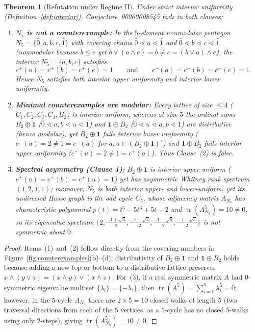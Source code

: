 \documentclass[11pt,a4paper]{article}
\newtheorem{theorem}{Theorem}[section]
\theoremstyle{definition}
\theoremstyle{remark}
\newcommand{\cov}{\lessdot}
\newcommand{\tr}{\operatorname{tr}}
\begin{document}
\begin{theorem}[Refutation under Regime II]\label{thm:regime-II}
Under strict interior uniformity (Definition~\ref{def:interior}), Conjecture~00000008545 fails in both clauses:
\begin{enumerate}
  \item[(1)] \textbf{$N_5$ is not a counterexample:} In the $5$-element nonmodular pentagon $N_5 = \{\hat{0}, a, b, c, \hat{1}\}$ with covering chains $\hat{0} \cov a \cov \hat{1}$ and $\hat{0} \cov b \cov c \cov \hat{1}$ (nonmodular because $b \le c$ yet $b \vee (a \wedge c) = b \neq c = (b \vee a) \wedge c$), the interior $N_5^\circ = \{a, b, c\}$ satisfies
  \[
    c^+(a) = c^+(b) = c^+(c) = 1 \qquad \text{and} \qquad c^-(a) = c^-(b) = c^-(c) = 1.
  \]
  Hence $N_5$ \emph{satisfies} both interior upper uniformity and interior lower uniformity.
  \item[(2)] \textbf{Minimal counterexamples are modular:} Every lattice of size $\le 4$ ($C_1, C_2, C_3, C_4, B_2$) is interior uniform, whereas at size $5$ the ordinal sums $B_2 \oplus \mathbf{1}$ ($\hat{0} \cov a, b \cov u \cov \hat{1}$) and $\mathbf{1} \oplus B_2$ ($\hat{0} \cov u \cov a, b \cov \hat{1}$) are \emph{distributive} (hence \emph{modular}), yet $B_2 \oplus \mathbf{1}$ fails interior lower uniformity ($c^-(u) = 2 \neq 1 = c^-(a)$ for $a, u \in (B_2 \oplus \mathbf{1})^\circ$) and $\mathbf{1} \oplus B_2$ fails interior upper uniformity ($c^+(u) = 2 \neq 1 = c^+(a)$). Thus Clause~(2) is false.
  \item[(3)] \textbf{Spectral asymmetry (Clause 1):} $B_2 \oplus \mathbf{1}$ is interior upper-uniform ($c^+(a) = c^+(b) = c^+(u) = 1$) yet has asymmetric Whitney rank spectrum $(1,2,1,1)$; moreover, $N_5$ is both interior upper- and lower-uniform, yet its undirected Hasse graph is the odd cycle $C_5$, whose adjacency matrix $A_{N_5}$ has characteristic polynomial $p(t) = t^5 - 5t^3 + 5t - 2$ and $\tr(A_{N_5}^5) = 10 \neq 0$, so its eigenvalue spectrum $\{2, \frac{-1+\sqrt{5}}{2}, \frac{-1+\sqrt{5}}{2}, \frac{-1-\sqrt{5}}{2}, \frac{-1-\sqrt{5}}{2}\}$ is not symmetric about $0$.
\end{enumerate}
\end{theorem}
\begin{proof}
Items~(1) and~(2) follow directly from the covering numbers in Figure~\ref{fig:counterexamples}(b)--(d); distributivity of $B_2 \oplus \mathbf{1}$ and $\mathbf{1} \oplus B_2$ holds because adding a new top or bottom to a distributive lattice preserves $x \wedge (y \vee z) = (x \wedge y) \vee (x \wedge z)$. For~(3), if a real symmetric matrix $A$ had $0$-symmetric eigenvalue multiset $\{\lambda_i\} = \{-\lambda_i\}$, then $\tr(A^5) = \sum_{i=1}^5 \lambda_i^5 = 0$; however, in the $5$-cycle $A_{N_5}$ there are $2 \times 5 = 10$ closed walks of length $5$ (two traversal directions from each of the $5$ vertices, as a $5$-cycle has no closed $5$-walks using only $2$-steps), giving $\tr(A_{N_5}^5) = 10 \neq 0$.
\end{proof}
\end{document}
